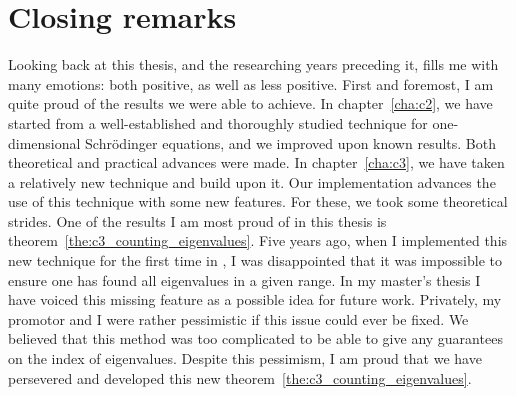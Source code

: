 


\chapter*{Closing remarks}

Looking back at this thesis, and the researching years preceding it, fills me with many emotions: both positive, as well as less positive. First and foremost, I am quite proud of the results we were able to achieve. In chapter~\ref{cha:c2}, we have started from a well-established and thoroughly studied technique for one-dimensional Schrödinger equations, and we improved upon known results. Both theoretical and practical advances were made. In chapter~\ref{cha:c3}, we have taken a relatively new technique and build upon it. Our implementation advances the use of this technique with some new features. For these, we took some theoretical strides. One of the results I am most proud of in this thesis is theorem~\ref{the:c3_counting_eigenvalues}. Five years ago, when I implemented this new technique for the first time in \matlab{}, I was disappointed that it was impossible to ensure one has found all eigenvalues in a given range. In my master's thesis I have voiced this missing feature as a possible idea for future work. Privately, my promotor and I were rather pessimistic if this issue could ever be fixed. We believed that this method was too complicated to be able to give any guarantees on the index of eigenvalues. Despite this pessimism, I am proud that we have persevered and developed this new theorem~\ref{the:c3_counting_eigenvalues}.

